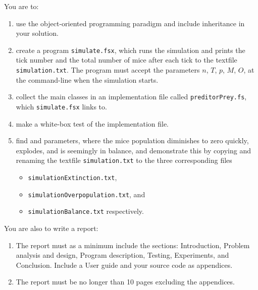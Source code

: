 You are to:
\begin{enumerate}
\item use the object-oriented programming paradigm and include inheritance in your solution.
\item create a program \lstinline[language=console]{simulate.fsx}, which runs the simulation and prints the tick number and the total number of mice after each tick to the textfile \lstinline[language=console]{simulation.txt}. The program must accept the parameters $n$, $T$, $p$, $M$, $O$, at the command-line when the simulation starts.
\item collect the main classes in an implementation file called \lstinline[language=console]{preditorPrey.fs}, which \lstinline[language=console]{simulate.fsx} links to.
\item make a white-box test of the implementation file.
\item find and parameters, where the mice population diminishes to zero quickly, explodes, and is seemingly in balance, and demonstrate this by copying and renaming the textfile \lstinline[language=console]{simulation.txt} to the three corresponding files
  \begin{itemize}
  \item \lstinline[language=console]{simulationExtinction.txt},
  \item \lstinline[language=console]{simulationOverpopulation.txt}, and
  \item \lstinline[language=console]{simulationBalance.txt} respectively.
  \end{itemize}
\end{enumerate}
You are also to write a report:
\begin{enumerate}[resume]
\item The report must as a minimum include
  the sections: Introduction, Problem analysis and design, Program
  description, Testing, Experiments, and Conclusion. Include a User
  guide and your source code as appendices.
\item The report must be
  no longer than 10 pages excluding the appendices.
\end{enumerate}
